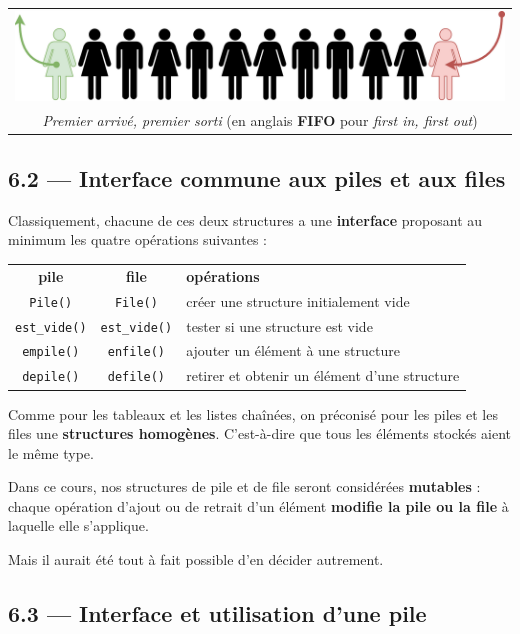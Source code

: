 \documentclass[a4paper,17pt]{extarticle}
\begin{document}
\begin{longtable}[]{@{}c@{}}
\toprule
\endhead
\includegraphics{img-file.png}\tabularnewline
\emph{Premier arrivé, premier sorti} (en anglais \textbf{FIFO} pour
\emph{first in, first out})\tabularnewline
\bottomrule
\end{longtable}

    \hypertarget{interface-commune-aux-piles-et-aux-files}{%
\subsection{6.2 --- Interface commune aux piles et aux
files}\label{interface-commune-aux-piles-et-aux-files}}

    Classiquement, chacune de ces deux structures a une \textbf{interface}
proposant au minimum les quatre opérations suivantes :

\begin{longtable}[]{@{}ccl@{}}
\toprule
\endhead
\textbf{pile} & \textbf{file} & \textbf{opérations}\tabularnewline
\texttt{Pile()} & \texttt{File()} & créer une structure initialement
vide\tabularnewline
\texttt{est\_vide()} & \texttt{est\_vide()} & tester si une structure
est vide\tabularnewline
\texttt{empile()} & \texttt{enfile()} & ajouter un élément à une
structure\tabularnewline
\texttt{depile()} & \texttt{defile()} & retirer et obtenir un élément
d'une structure\tabularnewline
\bottomrule
\end{longtable}

    Comme pour les tableaux et les listes chaînées, on préconisé pour les
piles et les files une \textbf{structures homogènes}. C'est-à-dire que
tous les éléments stockés aient le même type.

    Dans ce cours, nos structures de pile et de file seront considérées
\textbf{mutables} : chaque opération d'ajout ou de retrait d'un élément
\textbf{modifie la pile ou la file} à laquelle elle s'applique.

Mais il aurait été tout à fait possible d'en décider autrement.

    \hypertarget{interface-et-utilisation-dune-pile}{%
\subsection{6.3 --- Interface et utilisation d'une
pile}\label{interface-et-utilisation-dune-pile}}
\end{document}
